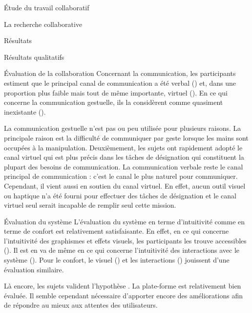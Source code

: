 \documentclass[myfrancais]{mythesis}
\begin{document}
\begin{mypart}{Étude du travail collaboratif}
\begin{mychapter}{La recherche collaborative}
\begin{mysection}{Résultats}
\begin{mysubsection}{Résultats qualitatifs}
\begin{mysubsubsection}{Évaluation de la collaboration}
						Concernant la communication, les participants estiment que le principal canal de communication a été verbal () et, dans une proportion plus faible mais tout de même importante, virtuel ().
						En ce qui concerne la communication gestuelle, ils la considèrent comme quasiment inexistante ().

						La communication gestuelle n'est pas ou peu utilisée pour plusieurs raisons.
						La principale raison est la difficulté de communiquer par geste lorsque les mains sont occupées à la manipulation.
						Deuxièmement, les sujets ont rapidement adopté le canal virtuel qui est plus précis dans les tâches de désignation qui constituent la plupart des besoins de communication.
						La communication verbale reste le canal principal de communication : c'est le canal le plus naturel pour communiquer.
						Cependant, il vient aussi en soutien du canal virtuel.
						En effet, aucun outil visuel ou haptique n'a été fourni pour effectuer des tâches de désignation et le canal virtuel seul serait incapable de remplir seul cette mission.
					\end{mysubsubsection}
					\begin{mysubsubsection}{Évaluation du système}
						L'évaluation du système en terme d'intuitivité comme en terme de confort est relativement satisfaisante.
						En effet, en ce qui concerne l'intuitivité des graphismes et effets visuels, les participants les trouve accessibles ().
						Il est en va de même en ce qui concerne l'intuitivité des interactions avec le système ().
						Pour le confort, le visuel () et les interactions () jouissent d'une évaluation similaire.

						Là encore, les sujets valident l'hypothèse .
						La plate-forme est relativement bien évaluée.
						Il semble cependant nécessaire d'apporter encore des améliorations afin de répondre au mieux aux attentes des utilisateurs.


\end{mysubsubsection}
\end{mysubsection}
\end{mysection}
\end{mychapter}
\end{mypart}
\end{document}

